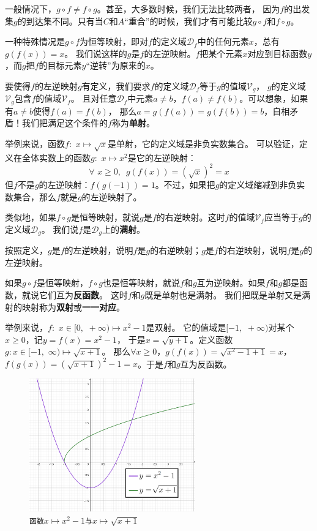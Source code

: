 \documentclass[12pt,UTF8]{ctexbook}
\begin{document}
一般情况下，$g\circ f \neq f\circ g$。甚至，大多数时候，我们无法比较两者，
因为$f$的出发集$g$的到达集不同。只有当$C$和$A$“重合”的时候，我们才有可能比较$g\circ f$和$f\circ g$。

一种特殊情况是$g\circ f$为恒等映射，即对$f$的定义域$\mathcal{D}_f$中的任何元素$x$，总有$g(f(x)) = x$。
我们说这样的$g$是$f$的左逆映射。$f$把某个元素$x$对应到目标函数$y$，而$g$把$f$的目标元素$y$“逆转”为原来的$x$。

要使得$f$的左逆映射$g$有定义，我们要求$f$的定义域$\mathcal{D}_f$等于$g$的值域$\mathcal{V}_g$，
$g$的定义域$\mathcal{V}_g$包含$f$的值域$\mathcal{V}_f$。
且对任意$\mathcal{D}_f$中元素$a \neq b$，$f(a) \neq f(b)$。可以想象，如果有$a \neq b$使得$f(a) = f(b)$，
那么$a = g(f(a)) = g(f(b)) = b$，自相矛盾！我们把满足这个条件的$f$称为\textbf{单射}。

举例来说，函数$f: \,\,x \mapsto \sqrt{x}$是单射，它的定义域是非负实数集合。
可以验证，定义在全体实数上的函数$g:\,\, x \mapsto x^2$是它的左逆映射：
$$ \forall \,\, x \geqslant 0, \,\,\, g(f(x)) = \left(\sqrt{x}\right)^2 = x$$
但$f$不是$g$的左逆映射：$f(g(-1)) = 1$。不过，如果把$g$的定义域缩减到非负实数集合，那么$f$就是$g$的左逆映射了。

类似地，如果$f\circ g$是恒等映射，就说$g$是$f$的右逆映射。这时$f$的值域$\mathcal{V}_f$应当等于$g$的定义域$\mathcal{D}_g$。
我们说$f$是$\mathcal{D}_g$上的\textbf{满射}。

按照定义，$g$是$f$的左逆映射，说明$f$是$g$的右逆映射；$g$是$f$的右逆映射，说明$f$是$g$的左逆映射。

如果$g\circ f$是恒等映射，$f\circ g$也是恒等映射，就说$f$和$g$互为逆映射。如果$f$和$g$都是函数，就说它们互为\textbf{反函数}。
这时$f$和$g$既是单射也是满射。
我们把既是单射又是满射的映射称为\textbf{双射}或\textbf{一一对应}。

举例来说，$f: \,\,x\in[0,\,\,+\infty) \mapsto x^2 - 1$是双射。
它的值域是$[-1,\,\,+\infty)$对某个$x\geqslant 0$，记$y = f(x) = x^2 - 1$，
于是$x = \sqrt{y + 1}$。定义函数$g:x\in[-1, \,\,\infty)\mapsto\sqrt{x + 1}$。
那么$\forall x \geqslant 0$，$g(f(x)) = \sqrt{x^2 - 1 + 1} = x$，
$f(g(x)) = \left(\sqrt{x + 1}\right)^2 - 1 = x$。于是$f$和$g$互为反函数。

\begin{figure}[h] %
    \vspace{4pt}
    \centering
    \includegraphics[width=0.64\textwidth]{反函数2.png}
    \caption*{\texttt{函数}$x\mapsto x^2 - 1$\texttt{与}$x\mapsto \sqrt{x + 1}$}
\end{figure}
\end{document}
